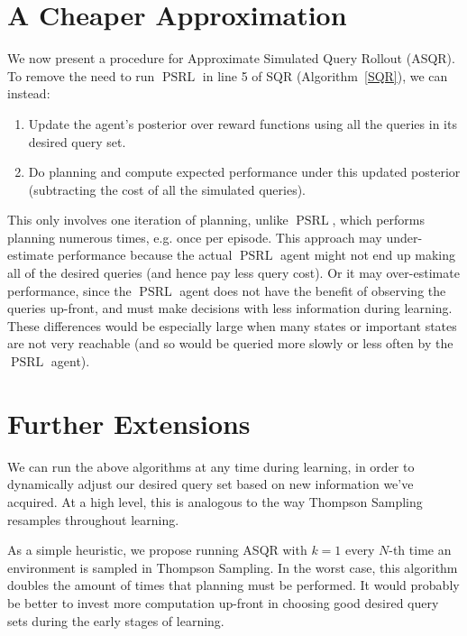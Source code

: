 \documentclass{article}
\begin{document}
\section{A Cheaper Approximation}
We now present a procedure for Approximate Simulated Query Rollout (ASQR).
To remove the need to run $\mathop{PSRL}$ in line 5 of SQR (Algorithm~\ref{SQR}), we can instead:

\begin{enumerate}
\item Update the agent's posterior over reward functions using all the queries in its desired query set.%
\item Do planning and compute expected performance under this updated posterior (subtracting the cost of all the simulated queries).
\end{enumerate}

This only involves one iteration of planning, unlike $\mathop{PSRL}$, which performs planning numerous times, e.g. once per episode.
This approach may under-estimate performance because the actual $\mathop{PSRL}$ agent might not end up making all of the desired queries (and hence pay less query cost).
Or it may over-estimate performance, since the $\mathop{PSRL}$ agent does not have the benefit of observing the queries up-front, and must make decisions with less information during learning.
These differences would be especially large when many states or important states are not very reachable (and so would be queried more slowly or less often by the $\mathop{PSRL}$ agent).

\section{Further Extensions}
We can run the above algorithms at any time during learning, in order to dynamically adjust our desired query set based on new information we've acquired.
At a high level, this is analogous to the way Thompson Sampling resamples throughout learning.

As a simple heuristic, we propose running ASQR with $k=1$ every $N$-th time an environment is sampled in Thompson Sampling.
In the worst case, this algorithm doubles the amount of times that planning must be performed.
It would probably be better to invest more computation up-front in choosing good desired query sets during the early stages of learning.
\end{document}
